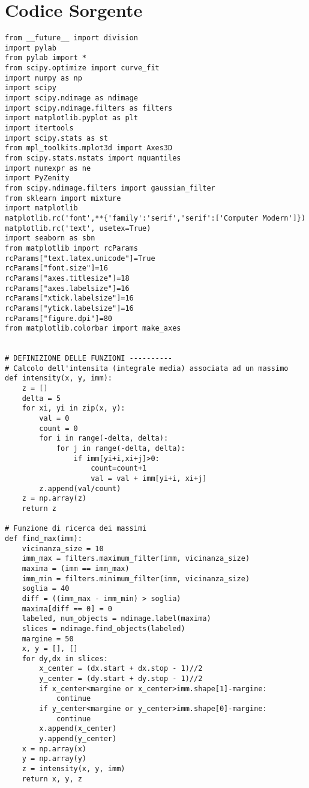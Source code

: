 \clearpage{\pagestyle{empty}\cleardoublepage}
\chapter{Codice Sorgente} 
\label{appendiceWSS} 

\lstset{language=Python, numbers=left, stepnumber=1, breaklines=true}

\begin{lstlisting}
from __future__ import division
import pylab
from pylab import *
from scipy.optimize import curve_fit
import numpy as np
import scipy
import scipy.ndimage as ndimage
import scipy.ndimage.filters as filters
import matplotlib.pyplot as plt
import itertools
import scipy.stats as st
from mpl_toolkits.mplot3d import Axes3D
from scipy.stats.mstats import mquantiles
import numexpr as ne
import PyZenity
from scipy.ndimage.filters import gaussian_filter
from sklearn import mixture
import matplotlib
matplotlib.rc('font',**{'family':'serif','serif':['Computer Modern']})
matplotlib.rc('text', usetex=True)
import seaborn as sbn
from matplotlib import rcParams
rcParams["text.latex.unicode"]=True
rcParams["font.size"]=16
rcParams["axes.titlesize"]=18
rcParams["axes.labelsize"]=16
rcParams["xtick.labelsize"]=16
rcParams["ytick.labelsize"]=16
rcParams["figure.dpi"]=80
from matplotlib.colorbar import make_axes


# DEFINIZIONE DELLE FUNZIONI ----------
# Calcolo dell'intensita (integrale media) associata ad un massimo 
def intensity(x, y, imm):
    z = []    
    delta = 5
    for xi, yi in zip(x, y):
        val = 0
        count = 0
        for i in range(-delta, delta):
            for j in range(-delta, delta):
                if imm[yi+i,xi+j]>0:
                    count=count+1
                    val = val + imm[yi+i, xi+j]
        z.append(val/count)  
    z = np.array(z)
    return z
        
# Funzione di ricerca dei massimi 
def find_max(imm):
    vicinanza_size = 10
    imm_max = filters.maximum_filter(imm, vicinanza_size)
    maxima = (imm == imm_max)
    imm_min = filters.minimum_filter(imm, vicinanza_size)
    soglia = 40
    diff = ((imm_max - imm_min) > soglia)
    maxima[diff == 0] = 0
    labeled, num_objects = ndimage.label(maxima)
    slices = ndimage.find_objects(labeled)
    margine = 50
    x, y = [], []
    for dy,dx in slices:
        x_center = (dx.start + dx.stop - 1)//2
        y_center = (dy.start + dy.stop - 1)//2 
        if x_center<margine or x_center>imm.shape[1]-margine:
            continue                                         
        if y_center<margine or y_center>imm.shape[0]-margine:
            continue
        x.append(x_center)
        y.append(y_center)
    x = np.array(x)
    y = np.array(y)
    z = intensity(x, y, imm)
    return x, y, z


\end{lstlisting}

